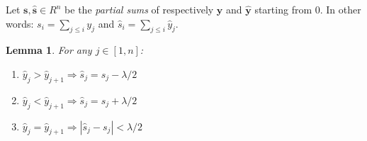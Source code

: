 \documentclass{article}
\newtheorem{lemma}[theorem]{Lemma}
\theoremstyle{definition}
\def\*#1{\mathbf{#1}}
\begin{document}
Let $\*s, \hat{\*s} \in R^{n }$ be the {\em partial sums} of respectively $\*y$ and $\hat{\*y}$
starting from $0$. In other words: $s_i = \sum_{j \leq i} y_{j}$ and $\hat{s}_i = \sum_{j \leq i} \hat{y}_{j}$.

\begin{lemma}\label{bounding}
  For any $j \in [1, n]$:
  \begin{enumerate}
    \item $ \hat{y}_{j} > \hat{y}_{j + 1} \Rightarrow \hat{s}_j = s_j - \lambda / 2$
    \item $ \hat{y}_{j} < \hat{y}_{j + 1} \Rightarrow \hat{s}_j = s_j + \lambda / 2$
    \item $ \hat{y}_{j} = \hat{y}_{j + 1} \Rightarrow |\hat{s}_j - s_j| < \lambda / 2$
  \end{enumerate}
\end{lemma}
\end{document}

